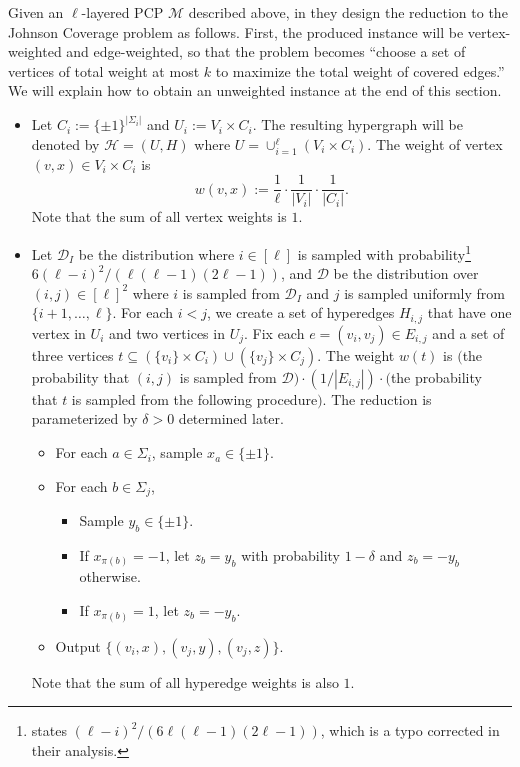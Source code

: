 \documentclass[11pt]{article}
\newcommand{\calm}{\mathcal{M}}
\newcommand{\calh}{\mathcal{H}}
\newcommand{\cald}{\mathcal{D}}
\begin{document}
Given an $\ell$-layered PCP $\calm$ described above, in \cite{Cohen-AddadSL22} they design the reduction to the Johnson Coverage problem as follows.
First, the produced instance will be vertex-weighted and edge-weighted, so that the problem becomes ``choose a set of vertices of total weight at most $k$ to maximize the total weight of covered edges.'' We will explain how to obtain an unweighted instance at the end of this section. 


\begin{itemize}
\item Let $C_i := \{ \pm 1 \}^{|\Sigma_i|}$ and $U_i := V_i \times C_i$. 
The resulting hypergraph will be denoted by $\calh = (U, H)$ where $U = \cup_{i=1}^{\ell} (V_i \times C_i)$. The weight of vertex $(v, x) \in V_i \times C_i$ is 
\[
w(v, x) :=\frac{1}{\ell} \cdot \frac{1}{|V_i|} \cdot \frac{1}{|C_i|}.
\]
Note that the sum of all vertex weights is $1$. 

\item Let $\cald_I$ be the distribution where $i \in [\ell]$ is sampled with probability\footnote{\cite{Cohen-AddadSL22} states $(\ell-i)^2 / (6\ell(\ell - 1)(2\ell - 1))$, which is a typo corrected in their analysis.} $6(\ell-i)^2 / (\ell(\ell - 1)(2\ell - 1))$, and $\cald$ be the distribution over $(i, j) \in [\ell]^2$ where $i$ is sampled from $\cald_I$ and $j$ is sampled uniformly from $\{ i+1, \dots, \ell \}$. For each $i < j$, we create a set of hyperedges $H_{i,j}$ that have one vertex in $U_i$ and two vertices in $U_j$. 
Fix each $e = (v_i, v_j) \in E_{i,j}$ and a set of three vertices $t \subseteq (\{ v_i \} \times C_i) \cup (\{ v_j \} \times C_j)$. The weight $w(t)$ is $($the probability that $(i, j)$ is sampled from $\cald) \cdot (1/|E_{i,j}|) \cdot ($the probability that $t$ is sampled from the following procedure$)$. The reduction is parameterized by $\delta > 0$ determined later. 
\begin{itemize}
\item For each $a \in \Sigma_i$, sample $x_a \in \{ \pm 1 \}$.
\item For each $b \in \Sigma_j$, 
\begin{itemize}
\item Sample $y_b \in \{ \pm 1 \}$. 
\item If $x_{\pi(b)} = -1$, let $z_b = y_b$ with probability $1-\delta$ and $z_b = -y_b$ otherwise.
\item If $x_{\pi(b)} = 1$, let $z_b = -y_b$. 
\end{itemize}
\item Output $\{ (v_i, x), (v_j, y), (v_j, z) \}$. 
\end{itemize}
Note that the sum of all hyperedge weights is also $1$. 
\end{itemize}
\end{document}

